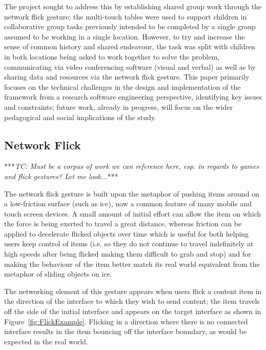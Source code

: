 \documentclass[a4paper,11pt]{article}
\begin{document}
The project sought to address this by establishing shared group work through the network flick gesture; the multi-touch tables were used to support children in collaborative group tasks previously intended to be completed by a single group assumed to be working in a single location.
However, to try and increase the sense of common history and shared endeavour, the task was split with children in both locations being asked to work together to solve the problem, communicating via video conferencing software (visual and verbal) as well as by sharing data and resources via the network flick gesture.
This paper primarily focuses on the technical challenges in the design and implementation of the framework from a research software engineering perspective, identifying key issues and constraints; future work, already in progress, will focus on the wider pedagogical and social implications of the study.

\subsection{Network Flick}

***{\emph{TC: Must be a corpus of work we can reference here, esp. in regards to games and flick gestures? Let me look...}}***

The network flick gesture is built upon the metaphor of pushing items around on a low-friction surface (such as ice), now a common feature of many mobile and touch screen devices.
A small amount of initial effort can allow the item on which the force is being exerted to travel a great distance, whereas friction can be applied to decelerate flicked objects over time which is useful for both helping users keep control of items (i.e. so they do not continue to travel indefinitely at high speeds after being flicked making them difficult to grab and stop) and for making the behaviour of the item better match its real world equivalent from the metaphor of sliding objects on ice.

The networking element of this gesture appears when users flick a content item in the direction of the interface to which they wish to send content; the item travels off the side of the initial interface and appears on the target interface as shown in Figure~\ref{fig:FlickExample}.
Flicking in a direction where there is no connected interface results in the item bouncing off the interface boundary, as would be expected in the real world.
\end{document}
